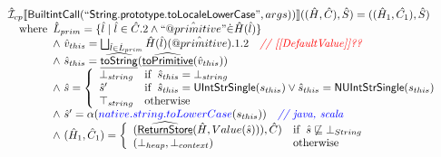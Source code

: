 \documentclass{article}
\makeatletter
\newcommand{\SF}[1]{\mbox{\textsf{#1}}}
\newcommand{\comment}[1]{\textit{#1}}
\newcommand{\wherec}[1]{{\rm where}\begin{array}[t]{l}#1\end{array}}
\newcommand{\ifc}[1]{{\rm if}\begin{array}[t]{l}#1\end{array}}
\newcommand{\owc}{{\rm otherwise}}
\newcommand{\aI}{\hat{\mathcal{I}}}
\newcommand{\lbr}{\llbracket}
\newcommand{\rbr}{\rrbracket}
\newcommand{\ahf}[1]{\widehat{\underline{\sf #1}}}
\newcommand{\avarprop}[1]{\hat{@#1}}
\def\inred{\color{red}}
\def\inblue{\color{blue}}
\def\inred{\color{red}}
\def\inblue{\color{blue}}
\makeatother
\begin{document}
\[\begin{array}{l}
\aI _{cp}\lbr \SF{BuiltintCall}(``\SF{String.prototype.toLocaleLowerCase}",args))\rbr((\hat{H},\hat{C}), \hat{S})
  = ((\hat{H}_1, \hat{C_1}), \hat{S})\\
\quad\wherec{ 
  \hat{L}_{prim} = \{ \hat{l} \mid \hat{l} \in \hat{C}.2 \land ``\avarprop{primitive}" \dot{\in}\hat{H}(\hat{l}) \}\\
  \land\ \hat{v}_{this} = \bigsqcup_{\hat{l} \in \hat{L}_{prim}} \hat{H}(\hat{l})(\avarprop{primitive}).1.2
    \quad\comment{{\inred // [[DefaultValue]]??}}\\
  \land\ \hat{s}_{this} = \ahf{toString}(\ahf{toPrimitive}(\hat{v}_{this}))\\
  \land\ \hat{s} = \left\{\begin{array}{ll}
      \bot_{string} & \ifc{\hat{s}_{this} = \bot_{string}}\\
      \hat{s}' & \ifc{\hat{s}_{this} = \SF{UIntStrSingle}(s_{this}) \lor \hat{s}_{this} = \SF{NUIntStrSingle}(s_{this}) }\\
      \top_{string} & \owc
    \end{array}\right.\\
  \land\ \hat{s}' = \alpha({\inblue native.string.toLowerCase}(s_{this}))
    \quad\comment{{\inblue // java, scala}}\\  
  \land\ (\hat{H}_1, \hat{C}_1) = 
    \left\{\begin{array}{ll}
      (\ahf{ReturnStore}(\hat{H}, Value(\hat{s}))), \hat{C})
      & \ifc{\hat{s} \not\sqsubseteq \bot_{String}}\\
      (\bot_{heap}, \bot_{context}) & \owc \\
    \end{array}\right.\\
  }\\
\\\\

\end{array}
\]
\end{document}
